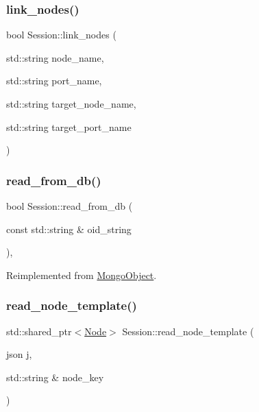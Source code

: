 \mbox{\label{class_session_a5eec7c1012a9a058f06347dd3cb18de3}} 
\subsubsection{\texorpdfstring{link\+\_\+nodes()}{link\_nodes()}}
{\footnotesize\ttfamily bool Session\+::link\+\_\+nodes (\begin{DoxyParamCaption}\item[{std\+::string}]{node\+\_\+name,  }\item[{std\+::string}]{port\+\_\+name,  }\item[{std\+::string}]{target\+\_\+node\+\_\+name,  }\item[{std\+::string}]{target\+\_\+port\+\_\+name }\end{DoxyParamCaption})}

\mbox{\label{class_session_a4f09644fd155a1d5640cedefe4aa42fc}} 
\subsubsection{\texorpdfstring{read\+\_\+from\+\_\+db()}{read\_from\_db()}}
{\footnotesize\ttfamily bool Session\+::read\+\_\+from\+\_\+db (\begin{DoxyParamCaption}\item[{const std\+::string \&}]{oid\+\_\+string }\end{DoxyParamCaption})\hspace{0.3cm}{\ttfamily [final]}, {\ttfamily [virtual]}}



Reimplemented from \hyperlink{class_mongo_object_a729412e226c9964e13ba80688c3f5e00}{Mongo\+Object}.

\mbox{\label{class_session_a8d085cbe91c4ab1632e4eed199120123}} 
\subsubsection{\texorpdfstring{read\+\_\+node\+\_\+template()}{read\_node\_template()}}
{\footnotesize\ttfamily std\+::shared\+\_\+ptr$<$\hyperlink{class_node}{Node}$>$ Session\+::read\+\_\+node\+\_\+template (\begin{DoxyParamCaption}\item[{json}]{j,  }\item[{std\+::string \&}]{node\+\_\+key }\end{DoxyParamCaption})}

